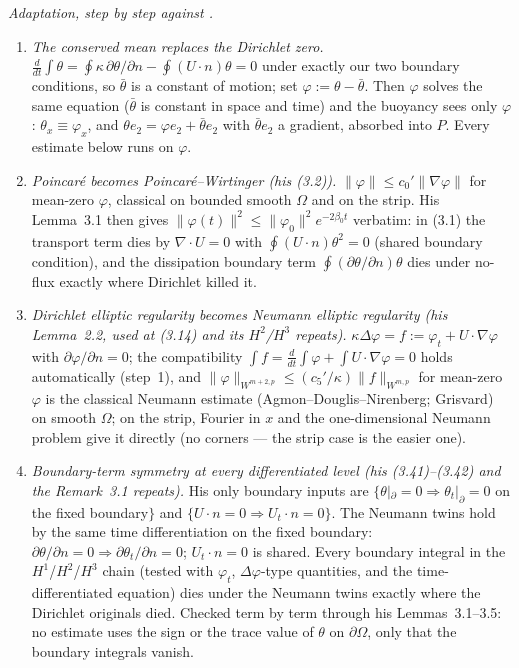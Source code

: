 \documentclass[11pt,a4paper]{article}
\newcommand{\nrm}[1]{\lVert #1 \rVert}
\begin{document}
\noindent\emph{Adaptation, step by step against \cite[\S3]{Zhao10}.}
\begin{enumerate}[leftmargin=2em]
\item \emph{The conserved mean replaces the Dirichlet zero.} $\frac{d}{dt}\int\theta=\oint\kappa\,\partial\theta/\partial n-\oint(U\cdot n)\theta=0$ under exactly our two boundary conditions, so $\bar\theta$ is a constant of motion; set $\varphi:=\theta-\bar\theta$. Then $\varphi$ solves the same equation ($\bar\theta$ is constant in space and time) and the buoyancy sees only $\varphi$: $\theta_x\equiv\varphi_x$, and $\theta e_2=\varphi e_2+\bar\theta e_2$ with $\bar\theta e_2$ a gradient, absorbed into $P$. Every estimate below runs on $\varphi$.
\item \emph{Poincaré becomes Poincaré--Wirtinger (his (3.2)).} $\nrm\varphi\le c_0'\nrm{\nabla\varphi}$ for mean-zero $\varphi$, classical on bounded smooth $\Omega$ and on the strip. His Lemma~3.1 then gives $\nrm{\varphi(t)}^2\le\nrm{\varphi_0}^2e^{-2\beta_0t}$ verbatim: in (3.1) the transport term dies by $\nabla\cdot U=0$ with $\oint(U\cdot n)\theta^2=0$ (shared boundary condition), and the dissipation boundary term $\oint(\partial\theta/\partial n)\theta$ dies under no-flux exactly where Dirichlet killed it.
\item \emph{Dirichlet elliptic regularity becomes Neumann elliptic regularity (his Lemma~2.2, used at (3.14) and its $H^2$/$H^3$ repeats).} $\kappa\Delta\varphi=f:=\varphi_t+U\cdot\nabla\varphi$ with $\partial\varphi/\partial n=0$; the compatibility $\int f=\frac{d}{dt}\int\varphi+\int U\cdot\nabla\varphi=0$ holds automatically (step~1), and $\nrm\varphi_{W^{m+2,p}}\le(c_5'/\kappa)\nrm f_{W^{m,p}}$ for mean-zero $\varphi$ is the classical Neumann estimate (Agmon--Douglis--Nirenberg; Grisvard) on smooth $\Omega$; on the strip, Fourier in $x$ and the one-dimensional Neumann problem give it directly (no corners --- the strip case is the easier one).
\item \emph{Boundary-term symmetry at every differentiated level (his (3.41)--(3.42) and the Remark~3.1 repeats).} His only boundary inputs are $\{\theta|_\partial=0\Rightarrow\theta_t|_\partial=0$ on the fixed boundary$\}$ and $\{U\cdot n=0\Rightarrow U_t\cdot n=0\}$. The Neumann twins hold by the same time differentiation on the fixed boundary: $\partial\theta/\partial n=0\Rightarrow\partial\theta_t/\partial n=0$; $U_t\cdot n=0$ is shared. Every boundary integral in the $H^1$/$H^2$/$H^3$ chain (tested with $\varphi_t$, $\Delta\varphi$-type quantities, and the time-differentiated equation) dies under the Neumann twins exactly where the Dirichlet originals died. Checked term by term through his Lemmas~3.1--3.5: no estimate uses the sign or the trace value of $\theta$ on $\partial\Omega$, only that the boundary integrals vanish.

\end{enumerate}
\end{document}
